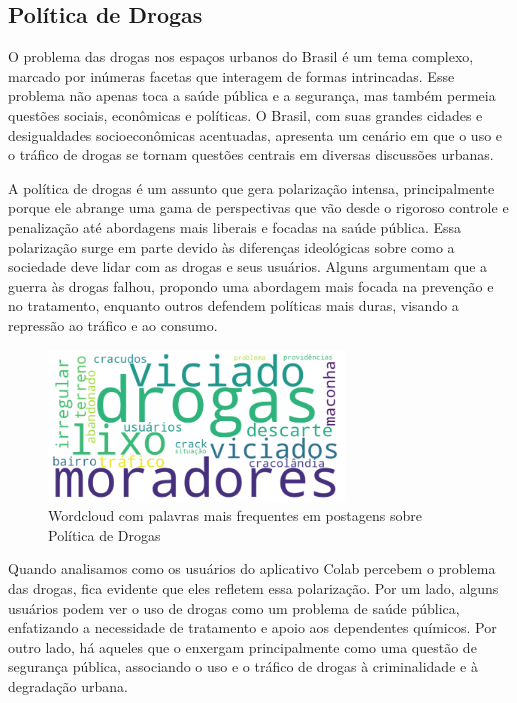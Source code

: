\subsection{Política de Drogas}

O problema das drogas nos espaços urbanos do Brasil é um tema complexo, marcado por inúmeras facetas que interagem de formas intrincadas. Esse problema não apenas toca a saúde pública e a segurança, mas também permeia questões sociais, econômicas e políticas. O Brasil, com suas grandes cidades e desigualdades socioeconômicas acentuadas, apresenta um cenário em que o uso e o tráfico de drogas se tornam questões centrais em diversas discussões urbanas.

A política de drogas é um assunto que gera polarização intensa, principalmente porque ele abrange uma gama de perspectivas que vão desde o rigoroso controle e penalização até abordagens mais liberais e focadas na saúde pública. Essa polarização surge em parte devido às diferenças ideológicas sobre como a sociedade deve lidar com as drogas e seus usuários. Alguns argumentam que a guerra às drogas falhou, propondo uma abordagem mais focada na prevenção e no tratamento, enquanto outros defendem políticas mais duras, visando a repressão ao tráfico e ao consumo.

\begin{figure}[htb]
	\centering
	\includegraphics[width=0.7\textwidth]{images/wordcloud_drugs.png}
	\caption{Wordcloud com palavras mais frequentes em postagens sobre Política de Drogas}
	\label{fig:wordcloud_drugs}
\end{figure}

Quando analisamos como os usuários do aplicativo Colab percebem o problema das drogas, fica evidente que eles refletem essa polarização. Por um lado, alguns usuários podem ver o uso de drogas como um problema de saúde pública, enfatizando a necessidade de tratamento e apoio aos dependentes químicos. Por outro lado, há aqueles que o enxergam principalmente como uma questão de segurança pública, associando o uso e o tráfico de drogas à criminalidade e à degradação urbana.

